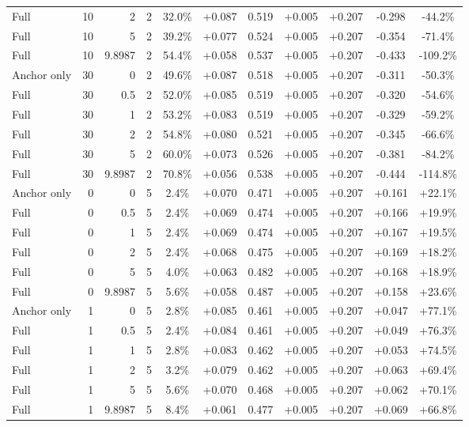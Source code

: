 \begin{table}[htbp]
\begin{tabular}{lrrrccccccc}
Full & 10 & 2 & 2 & 32.0\% & +0.087 & 0.519 & +0.005 & +0.207 & -0.298 & -44.2\% \\
Full & 10 & 5 & 2 & 39.2\% & +0.077 & 0.524 & +0.005 & +0.207 & -0.354 & -71.4\% \\
Full & 10 & 9.8987 & 2 & 54.4\% & +0.058 & 0.537 & +0.005 & +0.207 & -0.433 & -109.2\% \\
Anchor only & 30 & 0 & 2 & 49.6\% & +0.087 & 0.518 & +0.005 & +0.207 & -0.311 & -50.3\% \\
Full & 30 & 0.5 & 2 & 52.0\% & +0.085 & 0.519 & +0.005 & +0.207 & -0.320 & -54.6\% \\
Full & 30 & 1 & 2 & 53.2\% & +0.083 & 0.519 & +0.005 & +0.207 & -0.329 & -59.2\% \\
Full & 30 & 2 & 2 & 54.8\% & +0.080 & 0.521 & +0.005 & +0.207 & -0.345 & -66.6\% \\
Full & 30 & 5 & 2 & 60.0\% & +0.073 & 0.526 & +0.005 & +0.207 & -0.381 & -84.2\% \\
Full & 30 & 9.8987 & 2 & 70.8\% & +0.056 & 0.538 & +0.005 & +0.207 & -0.444 & -114.8\% \\
Anchor only & 0 & 0 & 5 & 2.4\% & +0.070 & 0.471 & +0.005 & +0.207 & +0.161 & +22.1\% \\
Full & 0 & 0.5 & 5 & 2.4\% & +0.069 & 0.474 & +0.005 & +0.207 & +0.166 & +19.9\% \\
Full & 0 & 1 & 5 & 2.4\% & +0.069 & 0.474 & +0.005 & +0.207 & +0.167 & +19.5\% \\
Full & 0 & 2 & 5 & 2.4\% & +0.068 & 0.475 & +0.005 & +0.207 & +0.169 & +18.2\% \\
Full & 0 & 5 & 5 & 4.0\% & +0.063 & 0.482 & +0.005 & +0.207 & +0.168 & +18.9\% \\
Full & 0 & 9.8987 & 5 & 5.6\% & +0.058 & 0.487 & +0.005 & +0.207 & +0.158 & +23.6\% \\
Anchor only & 1 & 0 & 5 & 2.8\% & +0.085 & 0.461 & +0.005 & +0.207 & +0.047 & +77.1\% \\
Full & 1 & 0.5 & 5 & 2.4\% & +0.084 & 0.461 & +0.005 & +0.207 & +0.049 & +76.3\% \\
Full & 1 & 1 & 5 & 2.8\% & +0.083 & 0.462 & +0.005 & +0.207 & +0.053 & +74.5\% \\
Full & 1 & 2 & 5 & 3.2\% & +0.079 & 0.462 & +0.005 & +0.207 & +0.063 & +69.4\% \\
Full & 1 & 5 & 5 & 5.6\% & +0.070 & 0.468 & +0.005 & +0.207 & +0.062 & +70.1\% \\
Full & 1 & 9.8987 & 5 & 8.4\% & +0.061 & 0.477 & +0.005 & +0.207 & +0.069 & +66.8\% \\

\end{tabular}
\end{table}
